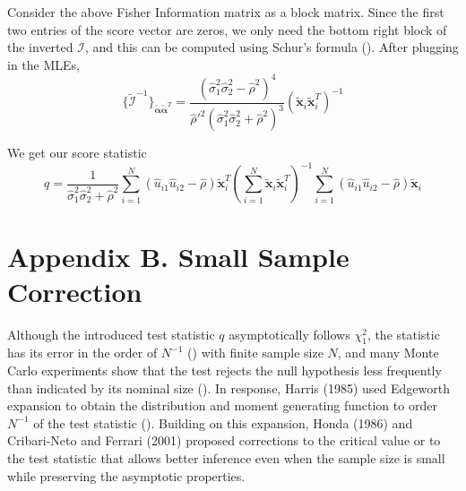 \documentclass[aoas,authoryear, preprint]{imsart}
\numberwithin{equation}{section}
\theoremstyle{plain}
\begin{document}
Consider the above Fisher Information matrix as a block matrix. Since the first two entries of the score vector are zeros, we only need the bottom right block of the inverted $\mathcal{I}$, and this can be computed using Schur's formula (\cite{haynsworth1968schur}). After plugging in the MLEs, 
$$\{\tilde{\mathcal{I}}^{-1} \}_{\bm{\tilde{\alpha}}\bm{\tilde{\alpha}}^T} = \frac{(\hat{\sigma}_1^2\hat{\sigma}_2^2-\hat{\rho}^2)^4}{\hat{\rho}'^2(\hat{\sigma}_1^2\hat{\sigma}_2^2+\hat{\rho}^2)^3}(\bm{\tilde{x}}_i\bm{\tilde{x}}_i^T)^{-1}$$

\noindent We get our score statistic
$$
    q = \frac{1}{\hat{\sigma}_1^2\hat{\sigma}_2^2+\hat{\rho}^2}\sum_{i=1}^{N} (\hat{u}_{i1}\hat{u}_{i2}-\hat{\rho})\bm{\tilde{x}}_i^T (\sum_{i=1}^{N}\bm{\tilde{x}}_i \bm{\tilde{x}}_i^T)^{-1}
    \sum_{i=1}^{N} (\hat{u}_{i1}\hat{u}_{i2}-\hat{\rho})\bm{\tilde{x}}_i
$$

\section*{Appendix B. Small Sample Correction}
Although the introduced test statistic $q$ asymptotically follows $\chi_1^2$, the statistic has its error in the order of $N^{-1}$ (\cite{harris1985asymptotic}) with finite sample size $N$, and many Monte Carlo experiments show that the test rejects the null hypothesis less frequently than indicated by its nominal size (\cite{godfrey1978testing, griffiths1986monte, honda1988size}). In response, Harris (1985) used Edgeworth expansion to obtain the distribution and moment generating function to order $N^{-1}$ of the test statistic (\cite{harris1985asymptotic}). Building on this expansion, Honda (1986) and Cribari-Neto and Ferrari (2001) proposed corrections to the critical value or to the test statistic that allows better inference even when the sample size is small while preserving the asymptotic properties.\\
\end{document}
